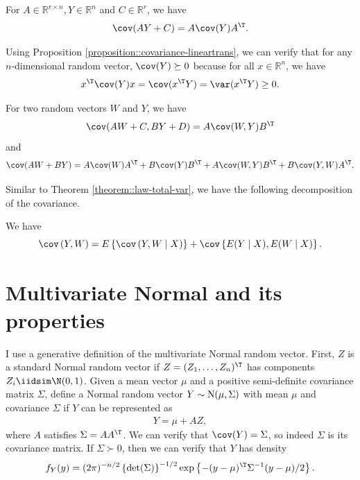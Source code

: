 \begin{proposition}\label{proposition::covariance-lineartrans}
For $A\in \mathbb{R}^{r\times n},Y\in\mathbb{R}^{n}$ and
$C\in\mathbb{R}^{r}$, we have 
$$
\cov(AY+C)=A\cov(Y)A^{\T} .
$$
\end{proposition}

Using Proposition \ref{proposition::covariance-lineartrans},
we can verify that for any $n$-dimensional random vector, $\cov(Y)\succeq0$
because for all $x\in\mathbb{R}^{n}$, we have 
\[
x^{\T}\cov(Y)x=\cov(x^{\T}Y)=\var(x^{\T}Y)\geq0.
\]

\begin{proposition}
For two random vectors $W$ and $Y$, we have
\[
\cov(AW+C,BY+D)=A\cov(W,Y)B^{\T}
\]
and 
\[
\cov(AW+BY)=A\cov(W)A^{\T}+B\cov(Y)B^{\T}+A\cov(W,Y)B^{\T}+B\cov(Y,W)A^{\T}.
\]
\end{proposition}


Similar to Theorem \ref{theorem::law-total-var}, we have the following decomposition of the covariance. 

\begin{theorem}
\label{theorem::law-total-cov}
We have 
\[
\cov\left(   Y, W    \right)  =E\left\{  \cov\left( Y ,W\mid X\right) \right\} +\cov\left\{ E(Y\mid X) , E(W\mid X) \right\}. 
\]
\end{theorem}



\section{Multivariate Normal and its properties}

I use a generative definition of the multivariate Normal random vector.
First, $Z$ is a standard Normal random vector if $Z=(Z_{1},\ldots,Z_{n})^{\T}$
has components $Z_{i}\iidsim \N(0,1)$. Given a mean vector $\mu$ and a
positive semi-definite covariance matrix $\Sigma$, define a Normal
random vector $Y\sim\text{N(\ensuremath{\mu,\Sigma})}$ with mean
$\mu$ and covariance $\Sigma$ if $Y$ can be represented as  
\begin{eqnarray}
Y=\mu+AZ, \label{eq::mvn-definitions}
\end{eqnarray}
where $A$ satisfies $\Sigma=AA^{\T}$. We can verify that $\cov(Y)=\Sigma$,
so indeed $\Sigma$ is its covariance matrix. If $\Sigma\succ0$,
then we can verify that $Y$ has density
\begin{equation}\label{equation::normal-density}
f_{Y}(y)=(2\pi)^{-n/2}\left\{ \det(\Sigma)\right\} ^{-1/2}\exp\left\{ -(y-\mu)^{\T}\Sigma^{-1}(y-\mu)/2\right\} .
\end{equation}

